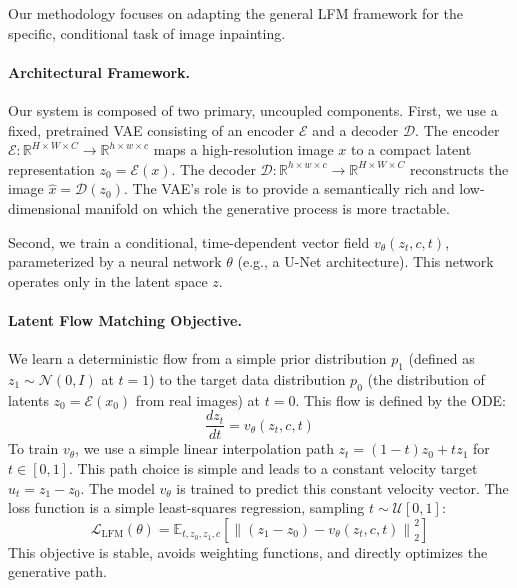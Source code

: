 \documentclass{article}
\newcommand{\E}{\mathbb{E}}
\newcommand{\R}{\mathbb{R}}
\newcommand{\norm}[1]{\left\lVert #1 \right\rVert}
\begin{document}
Our methodology focuses on adapting the general LFM framework for the specific, conditional task of image inpainting.

\paragraph{Architectural Framework.}
Our system is composed of two primary, uncoupled components. First, we use a fixed, pretrained VAE consisting of an encoder $\mathcal{E}$ and a decoder $\mathcal{D}$. The encoder $\mathcal{E}: \R^{H\times W\times C} \to \R^{h\times w\times c}$ maps a high-resolution image $x$ to a compact latent representation $z_0 = \mathcal{E}(x)$. The decoder $\mathcal{D}: \R^{h\times w\times c} \to \R^{H\times W\times C}$ reconstructs the image $\hat{x} = \mathcal{D}(z_0)$. The VAE's role is to provide a semantically rich and low-dimensional manifold on which the generative process is more tractable.

Second, we train a conditional, time-dependent vector field $v_{\theta}(z_t, c, t)$, parameterized by a neural network $\theta$ (e.g., a U-Net architecture). This network operates only in the latent space $z$.

\paragraph{Latent Flow Matching Objective.}
We learn a deterministic flow from a simple prior distribution $p_1$ (defined as $z_1 \sim \mathcal{N}(0, I)$ at $t=1$) to the target data distribution $p_0$ (the distribution of latents $z_0 = \mathcal{E}(x_0)$ from real images) at $t=0$. This flow is defined by the ODE:
\begin{equation}
\frac{dz_t}{dt} = v_{\theta}(z_t, c, t)
\label{eq:ode}
\end{equation}
To train $v_{\theta}$, we use a simple linear interpolation path $z_t = (1-t)z_0 + t z_1$ for $t \in [0, 1]$. This path choice is simple and leads to a constant velocity target $u_t = z_1 - z_0$. The model $v_{\theta}$ is trained to predict this constant velocity vector. The loss function is a simple least-squares regression, sampling $t \sim \mathcal{U}[0, 1]$:
\begin{equation}
\mathcal{L}_{\text{LFM}}(\theta) = \E_{t, z_0, z_1, c} \left[ \norm{ (z_1 - z_0) - v_{\theta}(z_t, c, t) }_2^2 \right]
\label{eq:lfm_loss}
\end{equation}
This objective is stable, avoids weighting functions, and directly optimizes the generative path.
\end{document}
